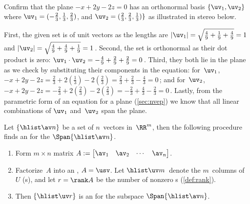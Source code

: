 \begin{example} \label{eg:orthbas2}
Confirm that the plane \(-x+2y-2z=0\) has an orthonormal basis \(\{\uv_1,\uv_2\}\) where \(\uv_1=(-\frac23,\frac13,\frac23)\), and \(\uv_2=(\frac23,\frac23,\frac13)\}\) as illustrated in stereo below.
\begin{center}
 {}
\end{center}
\begin{solution} 
First, the given set is of unit vectors as the lengths are \(|\uv_1|=\sqrt{\frac49+\frac19+\frac49}=1\) and \(|\uv_2|=\sqrt{\frac49+\frac49+\frac19}=1\)\,.
Second, the set is orthonormal as their dot product is zero: \(\uv_1\cdot\uv_2=-\frac49+\frac29+\frac29=0\)\,.
Third, they both lie in the plane as we check by substituting their components in the equation: for~\(\uv_1\), \(-x+2y-2z=\frac23+2(\frac13)-2(\frac23)=\frac23+\frac23-\frac43=0\)\,; and for~\(\uv_2\), \(-x+2y-2z=-\frac23+2(\frac23)-2(\frac23)=-\frac23+\frac43-\frac23=0\)\,.
Lastly, from the parametric form of an equation for a plane (\cref{sec:nvep}) we know that all linear combinations of \(\uv_1\) and~\(\uv_2\) span the plane.
\end{solution}
\end{example}





\begin{procedure}\label{pro:ospan}
	Let $\{\hlist\av n\}$ be a set of $n$~vectors in~\(\RR^m\), then the following procedure finds an  for the  \(\Span\{\hlist\av n\}\). 
\begin{enumerate}
\item Form \(m\times n\) matrix $A:= \begin{bmatrix} \av_1 & \av_2& \cdots&\av_n \end{bmatrix}$. 
\item Factorize~\(A\) into an \svd, $A=\usv$. 
Let \(\hlist\uv m\)~denote the \(m\)~columns of~$U$ (s), and let \(r=\rank A\) be the number of nonzero s (\cref{def:rank}).  
\item Then \(\{\hlist\uv r\}\) is an  for the subspace \(\Span\{\hlist\av n\}\).
\end{enumerate}
\end{procedure}

